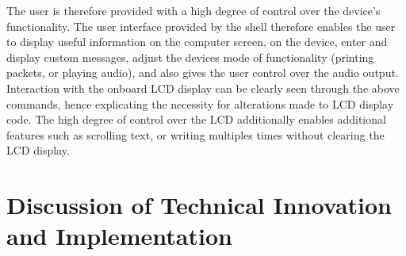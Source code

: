 \par\bigskip\noindent
The user is therefore provided with a high degree of control over the device's 
functionality. The user interface provided by the shell therefore enables the 
user to display useful information on the computer screen, on the device, 
enter and display custom messages, adjust the devices 
mode of functionality (printing packets, or playing audio), and also gives the 
user control over the audio output. 
Interaction with the onboard LCD display can be clearly seen through the above 
commands, hence explicating the necessity for alterations made to LCD display 
code.
The high degree of control over the LCD additionally enables additional features 
such as scrolling text, or writing multiples times without clearing the LCD 
display. 

\section{Discussion of Technical Innovation and Implementation}

